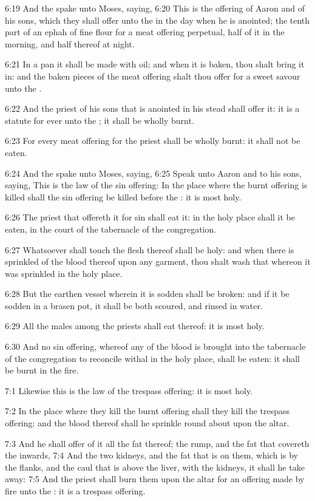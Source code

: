 6:19 And the \LORD spake unto Moses, saying, 6:20 This is the offering
of Aaron and of his sons, which they shall offer unto the \LORD in the
day when he is anointed; the tenth part of an ephah of fine flour for
a meat offering perpetual, half of it in the morning, and half thereof
at night.

6:21 In a pan it shall be made with oil; and when it is baken, thou
shalt bring it in: and the baken pieces of the meat offering shalt
thou offer for a sweet savour unto the \LORD.

6:22 And the priest of his sons that is anointed in his stead shall
offer it: it is a statute for ever unto the \LORD; it shall be wholly
burnt.

6:23 For every meat offering for the priest shall be wholly burnt: it
shall not be eaten.

6:24 And the \LORD spake unto Moses, saying, 6:25 Speak unto Aaron and
to his sons, saying, This is the law of the sin offering: In the place
where the burnt offering is killed shall the sin offering be killed
before the \LORD: it is most holy.

6:26 The priest that offereth it for sin shall eat it: in the holy
place shall it be eaten, in the court of the tabernacle of the
congregation.

6:27 Whatsoever shall touch the flesh thereof shall be holy: and when
there is sprinkled of the blood thereof upon any garment, thou shalt
wash that whereon it was sprinkled in the holy place.

6:28 But the earthen vessel wherein it is sodden shall be broken: and
if it be sodden in a brasen pot, it shall be both scoured, and rinsed
in water.

6:29 All the males among the priests shall eat thereof: it is most
holy.

6:30 And no sin offering, whereof any of the blood is brought into the
tabernacle of the congregation to reconcile withal in the holy place,
shall be eaten: it shall be burnt in the fire.

7:1 Likewise this is the law of the trespass offering: it is most
holy.

7:2 In the place where they kill the burnt offering shall they kill
the trespass offering: and the blood thereof shall he sprinkle round
about upon the altar.

7:3 And he shall offer of it all the fat thereof; the rump, and the
fat that covereth the inwards, 7:4 And the two kidneys, and the fat
that is on them, which is by the flanks, and the caul that is above
the liver, with the kidneys, it shall he take away: 7:5 And the priest
shall burn them upon the altar for an offering made by fire unto the
\LORD: it is a trespass offering.


